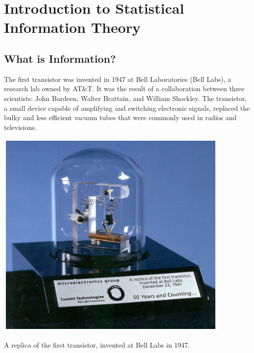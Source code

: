 
\chapter{Introduction to Statistical Information Theory}
\section{What is Information?}


The first transistor was invented in 1947 at Bell Laboratories (Bell Labs), a research lab owned by AT\&T. It was the result of a collaboration between three scientists: John Bardeen, Walter Brattain, and William Shockley. The transistor, a small device capable of amplifying and switching electronic signals, replaced the bulky and less efficient vacuum tubes that were commonly used in radios and televisions. \bigskip


\begin{marginfigure}
    \includegraphics[width=\linewidth]{img/transistor.png}
    \caption{A replica of the first transistor, invented at Bell Labs in 1947.}
\end{marginfigure}


